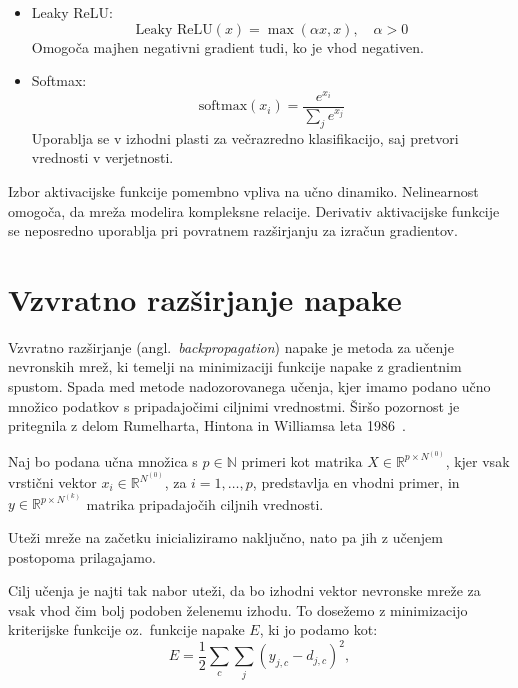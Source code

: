 \begin{itemize}
  \item Leaky ReLU:
  \[
  \text{Leaky ReLU}(x) = \max(\alpha x, x), \quad \alpha > 0
  \]
  Omogoča majhen negativni gradient tudi, ko je vhod negativen.
  \begin{figure}[H]
\centering
{}
\end{figure}


  \item Softmax:
  \[
  \text{softmax}(x_i) = \frac{e^{x_i}}{\sum_j e^{x_j}}
  \]
  Uporablja se v izhodni plasti za večrazredno klasifikacijo, saj pretvori vrednosti v verjetnosti.
\end{itemize}
Izbor aktivacijske funkcije pomembno vpliva na učno dinamiko. Nelinearnost omogoča, da mreža modelira kompleksne relacije. Derivativ aktivacijske funkcije se neposredno uporablja pri povratnem razširjanju za izračun gradientov.


\section{Vzvratno razširjanje napake}

Vzvratno razširjanje (angl.~\textit{backpropagation}) napake je metoda za učenje nevronskih mrež, ki temelji na minimizaciji funkcije napake z gradientnim spustom. Spada med metode nadozorovanega učenja, kjer imamo podano učno množico podatkov s pripadajočimi ciljnimi vrednostmi. Širšo pozornost je pritegnila z delom Rumelharta, Hintona in Williamsa leta 1986~\cite{Rumelhart1986}.

Naj bo podana učna množica s \( p \in \mathbb{N} \) primeri kot matrika \( X \in \mathbb{R}^{p \times N^{(0)}} \), kjer vsak vrstični vektor \( x_i \in \mathbb{R}^{N^{(0)}} \), za \( i = 1, \dots, p \), predstavlja en vhodni primer, in \( y \in \mathbb{R}^{p \times N^{(k)}} \) matrika pripadajočih ciljnih vrednosti.

Uteži mreže na začetku inicializiramo naključno, nato pa jih z učenjem postopoma prilagajamo.

Cilj učenja je najti tak nabor uteži, da bo izhodni vektor nevronske mreže za vsak vhod čim bolj podoben želenemu izhodu. To dosežemo z minimizacijo kriterijske funkcije oz.\ funkcije napake \( E \), ki jo podamo kot:
\[
E = \frac{1}{2} \sum_c \sum_j (y_{j,c} - d_{j,c})^2,
\]

